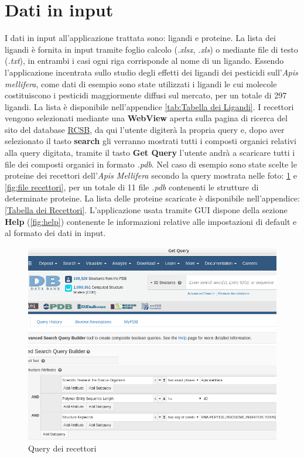 \section{Dati in input}
I dati in input all'applicazione trattata sono: ligandi e proteine.\newline
La lista dei ligandi è fornita in input tramite foglio calcolo (\textit{.xlsx}, \textit{.xls}) o mediante file di testo (\textit{.txt}), 
in entrambi i casi ogni riga corrisponde al nome di un ligando. Essendo l'applicazione incentrata sullo studio degli effetti dei ligandi dei pesticidi sull'\textit{Apis mellifera}, come dati di esempio sono state utilizzati i ligandi le cui molecole costituiscono i pesticidi maggiormente diffusi sul mercato, per un totale di 297 ligandi. La lista è disponibile nell'appendice \ref{tab:Tabella dei Ligandi}.\newline
I recettori vengono selezionati mediante una \textbf{WebView} aperta sulla pagina di ricerca del sito del database \href{https://www.rcsb.org/search}{RCSB}, da qui l'utente digiterà la propria query e, dopo aver selezionato il  tasto \textbf{search} gli verranno mostrati tutti i composti organici relativi alla query digitata, tramite il tasto \textbf{Get Query} l'utente andrà a scaricare tutti i file  dei composti organici in formato \textit{.pdb}.\newline
Nel caso di esempio sono state scelte le proteine dei recettori dell'\textit{Apis Mellifera} secondo la query mostrata nelle foto: \ref{fig:query recettori} e \ref{fig:file recettori}, per un totale di 11 file \textit{.pdb} contenenti le strutture di determinate proteine. La lista delle proteine scaricate è disponibile nell'appendice: \ref{Tabella dei Recettori}. L'applicazione usata tramite GUI dispone della sezione \textbf{Help} (\ref{fig:help}) contenente le informazioni relative alle impostazioni di default e al formato dei dati in input.

\begin{figure}[H]
    \centering
    \includegraphics[scale=0.57]{immagini/capitolo3/queryRecettori.png}
    \caption{Query dei recettori}
    \label{fig:query recettori}
\end{figure}

